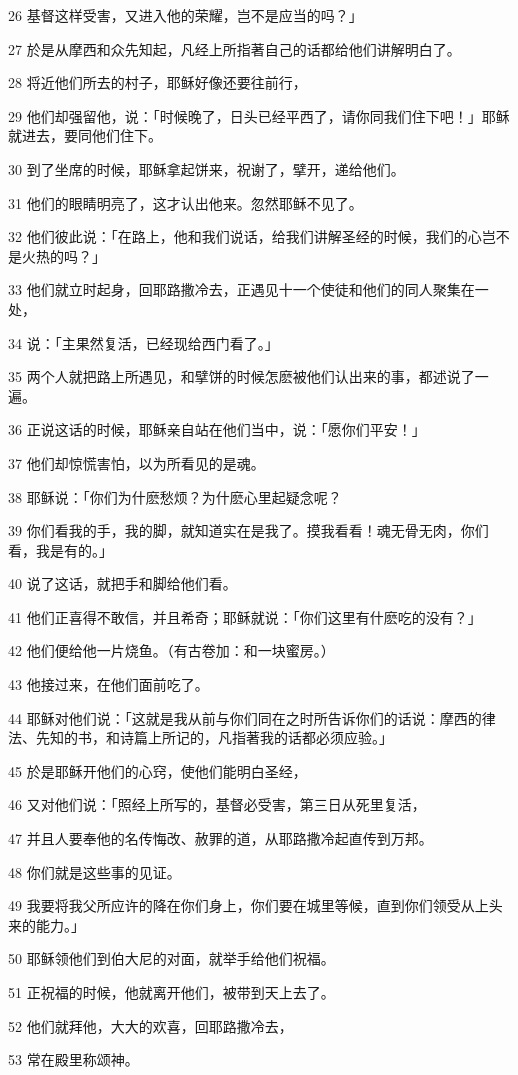 \par 26 基督这样受害，又进入他的荣耀，岂不是应当的吗？」
\par 27 於是从摩西和众先知起，凡经上所指著自己的话都给他们讲解明白了。
\par 28 将近他们所去的村子，耶稣好像还要往前行，
\par 29 他们却强留他，说：「时候晚了，日头已经平西了，请你同我们住下吧！」耶稣就进去，要同他们住下。
\par 30 到了坐席的时候，耶稣拿起饼来，祝谢了，擘开，递给他们。
\par 31 他们的眼睛明亮了，这才认出他来。忽然耶稣不见了。
\par 32 他们彼此说：「在路上，他和我们说话，给我们讲解圣经的时候，我们的心岂不是火热的吗？」
\par 33 他们就立时起身，回耶路撒冷去，正遇见十一个使徒和他们的同人聚集在一处，
\par 34 说：「主果然复活，已经现给西门看了。」
\par 35 两个人就把路上所遇见，和擘饼的时候怎麽被他们认出来的事，都述说了一遍。
\par 36 正说这话的时候，耶稣亲自站在他们当中，说：「愿你们平安！」
\par 37 他们却惊慌害怕，以为所看见的是魂。
\par 38 耶稣说：「你们为什麽愁烦？为什麽心里起疑念呢？
\par 39 你们看我的手，我的脚，就知道实在是我了。摸我看看！魂无骨无肉，你们看，我是有的。」
\par 40 说了这话，就把手和脚给他们看。
\par 41 他们正喜得不敢信，并且希奇；耶稣就说：「你们这里有什麽吃的没有？」
\par 42 他们便给他一片烧鱼。（有古卷加：和一块蜜房。）
\par 43 他接过来，在他们面前吃了。
\par 44 耶稣对他们说：「这就是我从前与你们同在之时所告诉你们的话说：摩西的律法、先知的书，和诗篇上所记的，凡指著我的话都必须应验。」
\par 45 於是耶稣开他们的心窍，使他们能明白圣经，
\par 46 又对他们说：「照经上所写的，基督必受害，第三日从死里复活，
\par 47 并且人要奉他的名传悔改、赦罪的道，从耶路撒冷起直传到万邦。
\par 48 你们就是这些事的见证。
\par 49 我要将我父所应许的降在你们身上，你们要在城里等候，直到你们领受从上头来的能力。」
\par 50 耶稣领他们到伯大尼的对面，就举手给他们祝福。
\par 51 正祝福的时候，他就离开他们，被带到天上去了。
\par 52 他们就拜他，大大的欢喜，回耶路撒冷去，
\par 53 常在殿里称颂神。


